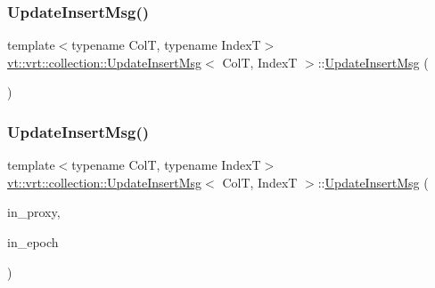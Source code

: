 \subsubsection{\texorpdfstring{Update\+Insert\+Msg()}{UpdateInsertMsg()}\hspace{0.1cm}{\footnotesize\ttfamily [1/2]}}
{\footnotesize\ttfamily template$<$typename ColT, typename IndexT$>$ \\
\hyperlink{structvt_1_1vrt_1_1collection_1_1_update_insert_msg}{vt\+::vrt\+::collection\+::\+Update\+Insert\+Msg}$<$ ColT, IndexT $>$\+::\hyperlink{structvt_1_1vrt_1_1collection_1_1_update_insert_msg}{Update\+Insert\+Msg} (\begin{DoxyParamCaption}{ }\end{DoxyParamCaption})\hspace{0.3cm}{\ttfamily [default]}}

\mbox{\label{structvt_1_1vrt_1_1collection_1_1_update_insert_msg_a379f7f91b839a1e691de20ac789f010e}} 
\subsubsection{\texorpdfstring{Update\+Insert\+Msg()}{UpdateInsertMsg()}\hspace{0.1cm}{\footnotesize\ttfamily [2/2]}}
{\footnotesize\ttfamily template$<$typename ColT, typename IndexT$>$ \\
\hyperlink{structvt_1_1vrt_1_1collection_1_1_update_insert_msg}{vt\+::vrt\+::collection\+::\+Update\+Insert\+Msg}$<$ ColT, IndexT $>$\+::\hyperlink{structvt_1_1vrt_1_1collection_1_1_update_insert_msg}{Update\+Insert\+Msg} (\begin{DoxyParamCaption}\item[{\hyperlink{structvt_1_1vrt_1_1collection_1_1_collection_proxy}{Collection\+Proxy}$<$ ColT, IndexT $>$}]{in\+\_\+proxy,  }\item[{\hyperlink{namespacevt_a985a5adf291c34a3ca263b3378388236}{Epoch\+Type} const \&}]{in\+\_\+epoch }\end{DoxyParamCaption})\hspace{0.3cm}{\ttfamily [inline]}}



